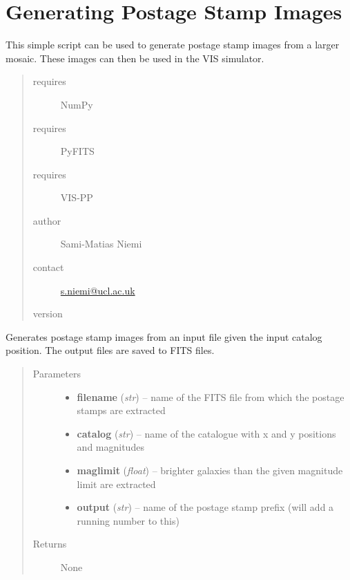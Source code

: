 \documentclass[a4paper,11pt,english]{sphinxmanual}
\begin{document}
\section{Generating Postage Stamp Images}
\label{sources:generating-postage-stamp-images}
This simple script can be used to generate postage stamp images from a larger mosaic.
These images can then be used in the VIS simulator.
\begin{quote}\begin{description}
\item[{requires}] \leavevmode
NumPy

\item[{requires}] \leavevmode
PyFITS

\item[{requires}] \leavevmode
VIS-PP

\item[{author}] \leavevmode
Sami-Matias Niemi

\item[{contact}] \leavevmode
\href{mailto:s.niemi@ucl.ac.uk}{s.niemi@ucl.ac.uk}

\item[{version}] 

\end{description}\end{quote}

\begin{fulllineitems}
\label{sources:sources.generatePostageStamps.generaPostageStamps}
Generates postage stamp images from an input file given the input catalog position.
The output files are saved to FITS files.
\begin{quote}\begin{description}
\item[{Parameters}] \leavevmode\begin{itemize}
\item {} 
\textbf{filename} (\emph{str}) -- name of the FITS file from which the postage stamps are extracted

\item {} 
\textbf{catalog} (\emph{str}) -- name of the catalogue with x and y positions and magnitudes

\item {} 
\textbf{maglimit} (\emph{float}) -- brighter galaxies than the given magnitude limit are extracted

\item {} 
\textbf{output} (\emph{str}) -- name of the postage stamp prefix (will add a running number to this)

\end{itemize}

\item[{Returns}] \leavevmode
None

\end{description}\end{quote}

\end{fulllineitems}
\end{document}
